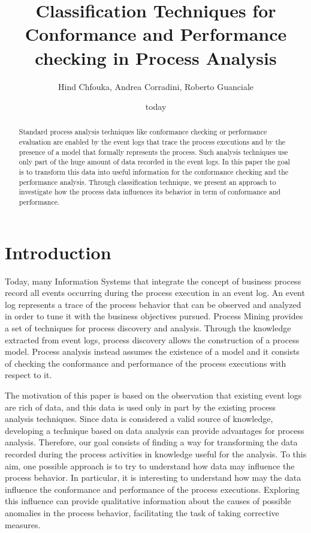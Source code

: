 \documentclass{llncs}
\title{Classification Techniques for Conformance and Performance checking in Process Analysis}
\author{Hind Chfouka, Andrea Corradini, Roberto Guanciale}
\institute{Department of Computer Science, Università di Pisa}
\date{today}
\begin{document}
\maketitle
\begin{abstract}
Standard process analysis techniques like conformance checking or performance evaluation are enabled by the event logs that trace the process executions and by the presence of a model that formally represents the process. Such analysis techniques use only part of the huge amount of data recorded in the event logs. In this paper the goal is to transform this data into useful information for the conformance checking and the performance analysis. Through classification technique, we present an approach to investigate how the process data influences its behavior in term of conformance and performance. 
\end{abstract}

\section{Introduction}
Today, many Information Systems that integrate the concept of business process record all events occurring during the process execution in an event log. An event log represents a trace of the process behavior that can be observed and analyzed in order to tune it with the business objectives pursued. Process Mining provides a set of techniques for process discovery and analysis. Through the knowledge extracted from event logs, process discovery allows the construction of a process model. Process analysis instead assumes the existence of a model and it consists of checking the conformance and performance of the process executions with respect to it.

The motivation of this paper is based on the observation that existing event logs are rich of data, and this data is used only in part by the existing process analysis techniques. Since data is considered a valid source of knowledge, developing a technique based on data analysis can provide advantages for  process analysis.
Therefore, our goal consists of finding a way for transforming the data recorded during the process activities in knowledge useful for the analysis. To this aim, one possible approach is to try to understand how data may influence the process behavior. In particular, it is interesting to understand how may the data influence the conformance and performance of the process executions. Exploring this influence can provide qualitative information about the causes of possible anomalies in the process behavior, facilitating the task of taking corrective measures.
\end{document}

